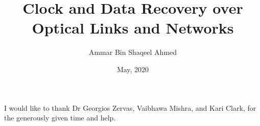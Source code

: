 \documentclass[oneside]{discothesis}
\title{Clock and Data Recovery over Optical Links and Networks}
\author{Ammar Bin Shaqeel Ahmed}
\institute{University College London}
\date{May, 2020}
\begin{document}
\frontmatter %
\maketitle
\cleardoublepage

\begin{acknowledgements}
    I would like to thank Dr Georgios Zervas, Vaibhawa Mishra, and Kari
    Clark, for the generously given time and help. 
\end{acknowledgements}

\tableofcontents

\mainmatter %










\end{document}
